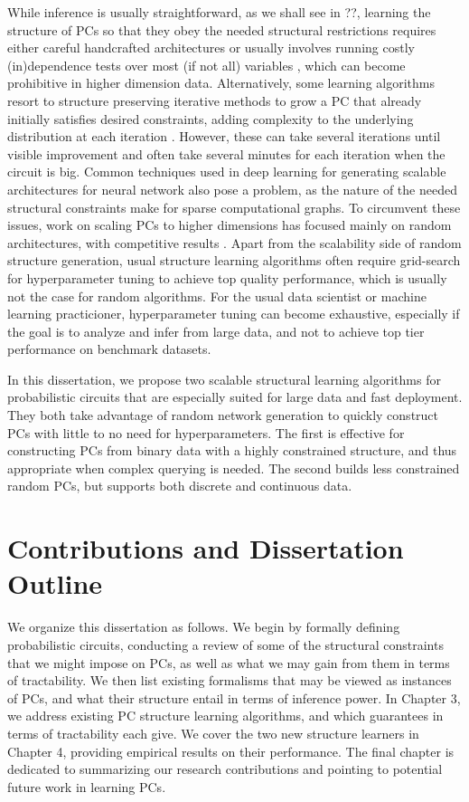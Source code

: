 While inference is usually straightforward, as we shall see in ??, learning the
structure of PCs so that they obey the needed structural restrictions requires either careful
handcrafted architectures \citep{poon11,cheng14,nath16} or usually involves running costly
(in)dependence tests over most (if not all) variables \citep{gens13,jaini18a,vergari15,dimauro17a},
which can become prohibitive in higher dimension data. Alternatively, some learning algorithms
resort to structure preserving iterative methods to grow a PC that already initially satisfies
desired constraints, adding complexity to the underlying distribution at each iteration
\citep{liang17,dang20}. However, these can take several iterations until visible improvement and
often take several minutes for each iteration when the circuit is big. Common techniques used in
deep learning for generating scalable architectures for neural network also pose a problem, as the
nature of the needed structural constraints make for sparse computational graphs. To circumvent
these issues, work on scaling PCs to higher dimensions has focused mainly on random architectures,
with competitive results \citep{peharz20a,dimauro21,geh21a,peharz20b}. Apart from the scalability
side of random structure generation, usual structure learning algorithms often require grid-search
for hyperparameter tuning to achieve top quality performance, which is usually not the case for
random algorithms. For the usual data scientist or machine learning practicioner, hyperparameter
tuning can become exhaustive, especially if the goal is to analyze and infer from large data, and
not to achieve top tier performance on benchmark datasets.

In this dissertation, we propose two scalable structural learning algorithms for probabilistic
circuits that are especially suited for large data and fast deployment. They both take advantage of
random network generation to quickly construct PCs with little to no need for hyperparameters. The
first is effective for constructing PCs from binary data with a highly constrained structure, and
thus appropriate when complex querying is needed. The second builds less constrained random PCs,
but supports both discrete and continuous data.

\section{Contributions and Dissertation Outline}

We organize this dissertation as follows. We begin  by formally defining probabilistic
circuits, conducting a review of some of the structural constraints that we might impose on PCs, as
well as what we may gain from them in terms of tractability. We then list existing formalisms that
may be viewed as instances of PCs, and what their structure entail in terms of inference power. In
Chapter 3, we address existing PC structure learning algorithms, and which guarantees in terms of
tractability each give. We cover the two new structure learners in Chapter 4, providing empirical
results on their performance. The final chapter is dedicated to summarizing our research
contributions and pointing to potential future work in learning PCs.

